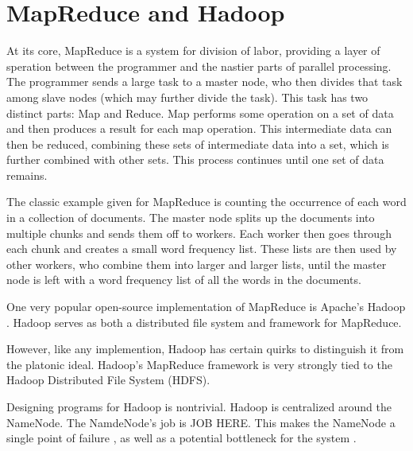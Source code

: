 \documentclass[conference, compsocconf, letterpaper]{IEEEtran}
\begin{document}



\section{MapReduce and Hadoop}
At its core, MapReduce \cite{mapreduce} is a system for division of labor, providing a layer of speration between the programmer and the nastier parts of parallel processing.  The programmer sends a large task to a master node, who then divides that task among slave nodes (which may further divide the task).  This task has two distinct parts: Map and Reduce.  Map performs some operation on a set of data and then produces a result for each map operation.  This intermediate data can then be reduced, combining these sets of intermediate data into a set, which is further combined with other sets.  This process continues until one set of data remains.

The classic example given for MapReduce is counting the occurrence of each word in a collection of documents.  The master node splits up the documents into multiple chunks and sends them off to workers.  Each worker then goes through each chunk and creates a small word frequency list.  These lists are then used by other workers, who combine them into larger and larger lists, until the master node is left with a word frequency list of all the words in the documents. 

One very popular open-source implementation of MapReduce is Apache's Hadoop \cite{Hadoop}.  Hadoop serves as both a distributed file system and framework for MapReduce\cite{shvachko2010hadoop}.

However, like any implemention, Hadoop has certain quirks to distinguish it from the platonic ideal.  Hadoop's MapReduce framework is very strongly tied to the Hadoop Distributed File System (HDFS).  

Designing programs for Hadoop is nontrivial.  Hadoop is  centralized around the NameNode.  The NamdeNode's job is JOB HERE.  This makes the NameNode a single point of failure \cite{shvachko2010hadoop}, as well as a potential bottleneck for the system \cite{hadoop-bottle}.
\end{document}
